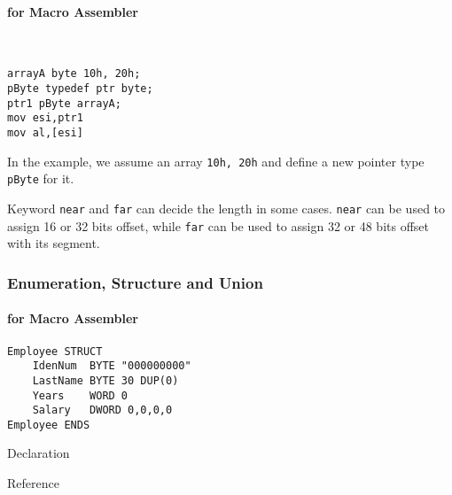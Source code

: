 \paragraph{for Macro Assembler} \

\lstset{style=GlobalASMx86}
\begin{lstlisting}[language={[x86masm]Assembler}]
arrayA byte 10h, 20h;
pByte typedef ptr byte;
ptr1 pByte arrayA;
mov esi,ptr1
mov al,[esi]
\end{lstlisting}

In the example, we assume an array \verb|10h, 20h| and define a new pointer type \verb|pByte| for it. 

Keyword \verb`near` and \verb`far` can decide the length in some cases.
\verb`near` can be used to assign 16 or 32 bits offset,
while \verb`far` can be used to assign 32 or 48 bits offset with its segment.


\subsubsection{Enumeration, Structure and Union}

\paragraph{for Macro Assembler}

\begin{lstlisting}[language={[x86masm]Assembler}]
Employee STRUCT
	IdenNum  BYTE "000000000"
	LastName BYTE 30 DUP(0)
	Years    WORD 0
	Salary   DWORD 0,0,0,0
Employee ENDS
\end{lstlisting}


{Declaration}

{Reference}






